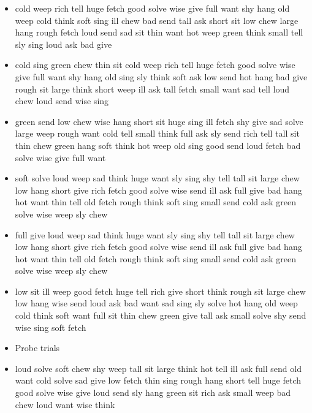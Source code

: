 \documentclass[11pt,a4wide]{article}
\begin{document}
\begin{itemize}
  \item cold weep rich tell huge fetch good solve wise give full want
    shy hang old weep cold think soft sing ill chew bad send tall ask
    short sit low chew large hang rough fetch loud send sad sit thin
    want hot weep green think small tell sly sing loud ask bad give

  \item cold sing green chew thin sit cold weep rich tell huge fetch
    good solve wise give full want shy hang old sing sly think soft
    ask low send hot hang bad give rough sit large think short weep
    ill ask tall fetch small want sad tell loud chew loud send wise
    sing

  \item green send low chew wise hang short sit huge sing ill fetch
    shy give sad solve large weep rough want cold tell small think
    full ask sly send rich tell tall sit thin chew green hang soft
    think hot weep old sing good send loud fetch bad solve wise give
    full want

  \item soft solve loud weep sad think huge want sly sing shy tell
    tall sit large chew low hang short give rich fetch good solve wise
    send ill ask full give bad hang hot want thin tell old fetch rough
    think soft sing small send cold ask green solve wise weep sly chew

  \item full give loud weep sad think huge want sly sing shy tell tall
    sit large chew low hang short give rich fetch good solve wise send
    ill ask full give bad hang hot want thin tell old fetch rough
    think soft sing small send cold ask green solve wise weep sly chew

  \item low sit ill weep good fetch huge tell rich give short think
    rough sit large chew low hang wise send loud ask bad want sad sing
    sly solve hot hang old weep cold think soft want full sit thin
    chew green give tall ask small solve shy send wise sing soft fetch

  \item Probe trials

  \item loud solve soft chew shy weep tall sit large think hot tell
    ill ask full send old want cold solve sad give low fetch thin sing
    rough hang short tell huge fetch good solve wise give loud send
    sly hang green sit rich ask small weep bad chew loud want wise
    think


\end{itemize}
\end{document}
